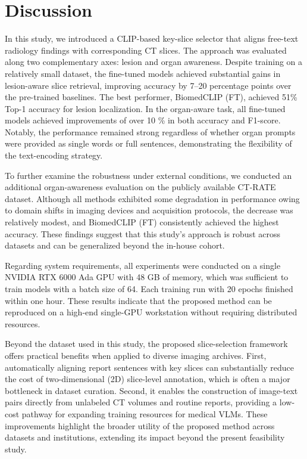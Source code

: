 \documentclass[bioengineering,article,submit,pdftex,moreauthors]{Definitions/mdpi}
\begin{document}
\section{Discussion}

In this study, we introduced a CLIP-based key-slice selector that aligns free-text radiology findings with corresponding CT slices. 
The approach was evaluated along two complementary axes: lesion and organ awareness. 
Despite training on a relatively small dataset, the fine-tuned models achieved substantial gains in lesion-aware slice retrieval, improving accuracy by 7–20 percentage points over the pre-trained baselines. 
The best performer, BiomedCLIP (FT), achieved 51\% Top-1 accuracy for lesion localization. 
In the organ-aware task, all fine-tuned models achieved improvements of over 10 \% in both accuracy and F1-score. 
Notably, the performance remained strong regardless of whether organ prompts were provided as single words or full sentences, demonstrating the flexibility of the text-encoding strategy. 

  To further examine the robustness under external conditions, we conducted an additional organ-awareness evaluation on the publicly available CT-RATE dataset. 
  Although all methods exhibited some degradation in performance owing to domain shifts in imaging devices and acquisition protocols, the decrease was relatively modest, and BiomedCLIP (FT) consistently achieved the highest accuracy. 
  These findings suggest that this study’s approach is robust across datasets and can be generalized beyond the in-house cohort.



  Regarding system requirements, all experiments were conducted on a single NVIDIA RTX 6000 Ada GPU with 48 GB of memory, which was sufficient to train models with a batch size of 64. 
  Each training run with 20 epochs finished within one hour. 
  These results indicate that the proposed method can be reproduced on a high-end single-GPU workstation without requiring distributed resources.



  Beyond the dataset used in this study, the proposed slice-selection framework offers practical benefits when applied to diverse imaging archives. 
  First, automatically aligning report sentences with key slices can substantially reduce the cost of two-dimensional (2D) slice-level annotation, which is often a major bottleneck in dataset curation. 
  Second, it enables the construction of image-text pairs directly from unlabeled CT volumes and routine reports, providing a low-cost pathway for expanding training resources for medical VLMs. 
  These improvements highlight the broader utility of the proposed method across datasets and institutions, extending its impact beyond the present feasibility study.
\end{document}
